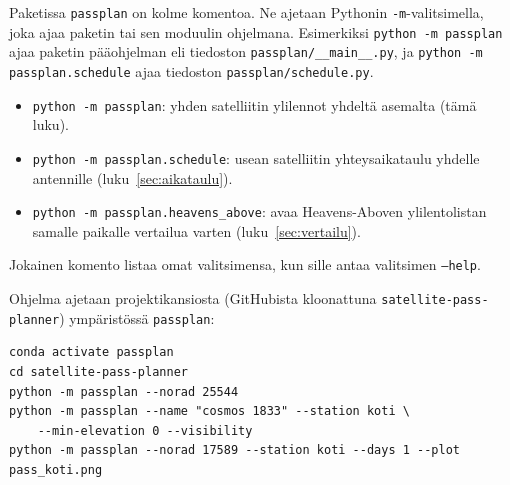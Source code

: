\documentclass[a4paper,11pt]{article}
\newcommand{\koodi}[1]{\texttt{#1}}
\begin{document}
Paketissa \koodi{passplan} on kolme komentoa. Ne ajetaan Pythonin \koodi{-m}-valitsimella,
joka ajaa paketin tai sen moduulin ohjelmana. Esimerkiksi \koodi{python -m passplan} ajaa
paketin pääohjelman eli tiedoston \koodi{passplan/\_\_main\_\_.py}, ja
\koodi{python -m passplan.schedule} ajaa tiedoston \koodi{passplan/schedule.py}.
\begin{itemize}
  \item \koodi{python -m passplan}: yhden satelliitin ylilennot yhdeltä asemalta (tämä luku).
  \item \koodi{python -m passplan.schedule}: usean satelliitin yhteysaikataulu yhdelle
    antennille (luku~\ref{sec:aikataulu}).
  \item \koodi{python -m passplan.heavens\_above}: avaa Heavens-Aboven ylilentolistan samalle
    paikalle vertailua varten (luku~\ref{sec:vertailu}).
\end{itemize}
Jokainen komento listaa omat valitsimensa, kun sille antaa valitsimen \koodi{--help}.

Ohjelma ajetaan projektikansiosta (GitHubista kloonattuna \koodi{satellite-pass-planner})
ympäristössä \koodi{passplan}:
\begin{verbatim}
conda activate passplan
cd satellite-pass-planner
python -m passplan --norad 25544
python -m passplan --name "cosmos 1833" --station koti \
    --min-elevation 0 --visibility
python -m passplan --norad 17589 --station koti --days 1 --plot pass_koti.png
\end{verbatim}
\end{document}
